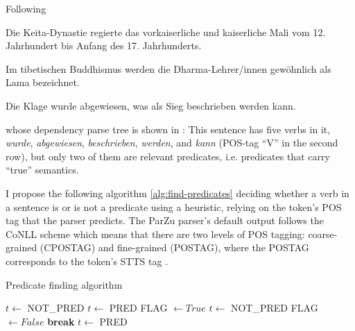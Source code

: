 Following \cite{foth2006umfassende}

\begin{examples}
	\label{ex:one-predicate}
	\item Die Keita-Dynastie regierte das vorkaiserliche und kaiserliche Mali vom 12. Jahrhundert bis Anfang des 17. Jahrhunderts.
\end{examples}

\begin{examples}
	\label{ex:one-predicate-mod}
	\item Im tibetischen Buddhismus werden die Dharma-Lehrer/innen gewöhnlich als Lama bezeichnet.
\end{examples}

\begin{examples}
	\label{ex:multiple-predicates}
	\item Die Klage wurde abgewiesen, was als Sieg beschrieben werden kann.
\end{examples}

whose dependency parse tree is shown in : This sentence has five
verbs in it, \textit{wurde}, \textit{abgewiesen}, \textit{beschrieben}, \textit{werden}, and
\textit{kann} (POS-tag ``V'' in the second row), but only two of them are relevant predicates,
i.e. predicates that carry ``true'' semantics.


I propose the following algorithm \ref{alg:find-predicates} deciding whether a verb in a sentence
is or is not a predicate using a heuristic, relying on the token's POS tag that the parser
predicts.  The ParZu parser's default output follows the CoNLL scheme \citep{buchholz2006conll}
which means that there are two levels of POS tagging: coarse-grained (CPOSTAG) and fine-grained
(POSTAG), where the POSTAG corresponds to the token's STTS tag \citep{schiller1999guidelines}.

\begin{algorithm}
\caption{Predicate finding algorithm}
\label{alg:find-predicates}
	\begin{algorithmic}[1]
			\STATE $t \leftarrow$ NOT\_PRED
		\ELSE
				\STATE $t \leftarrow$ PRED
			\ELSE
				\STATE FLAG $\leftarrow True$
						\STATE $t \leftarrow$ NOT\_PRED
						\STATE FLAG $\leftarrow False$
						\STATE \textbf{break}
					\ENDIF
				\ENDFOR
				\IF{FLAG $= True$}
					\STATE $t \leftarrow$ PRED
				\ENDIF
			\ENDIF
		\ENDIF
	\ENDFOR
\end{algorithmic}
\end{algorithm}

